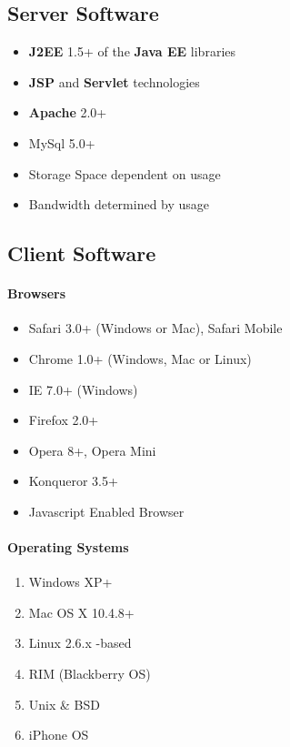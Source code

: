 \documentclass[letterpaper,12pt]{report}
\begin{document}
\subsection{Server Software}
\begin{itemize}
 \item {}\textbf{J2EE} 1.5+ of the \textbf{Java EE} libraries 
 \item \textbf{JSP} and \textbf{Servlet} technologies  
 \item \textbf{Apache} 2.0+
 \item MySql 5.0+ 
 \item Storage Space dependent on usage
 \item Bandwidth determined by usage
\end{itemize}

\subsection{Client Software}
\paragraph{Browsers}
\begin{itemize}
 \item Safari 3.0+ (Windows or Mac), Safari Mobile
 \item Chrome 1.0+ (Windows, Mac or Linux)
 \item IE 7.0+ (Windows)
 \item Firefox 2.0+
 \item Opera 8+, Opera Mini
 \item Konqueror 3.5+
 \item Javascript Enabled Browser
\end{itemize}

\paragraph{Operating Systems}
\begin{enumerate}
 \item Windows XP+
 \item Mac OS X 10.4.8+
 \item Linux 2.6.x -based
 \item RIM (Blackberry OS)
 \item Unix \& BSD
 \item iPhone OS
\end{enumerate}
\end{document}
